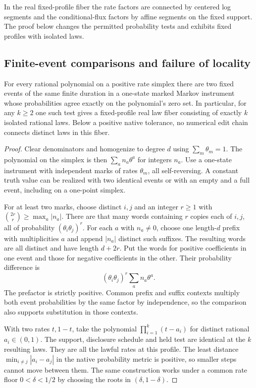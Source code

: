 In the real fixed-profile fiber the rate factors are connected by
centered log segments and the conditional-flux factors by affine
segments on the fixed support. The proof below changes the permitted
probability tests and exhibits fixed profiles with isolated laws.

\subsection{Finite-event comparisons and failure of locality}

\begin{theorem}\label{thm:finite-event}
For every rational polynomial on a positive rate simplex there are
two fixed events of the same finite duration in a one-state marked
Markov instrument whose probabilities agree exactly on the
polynomial's zero set. In particular, for any \(k\geq2\) one such
test gives a fixed-profile real law fiber consisting of exactly
\(k\) isolated rational laws. Below a positive native tolerance,
no numerical edit chain connects distinct laws in this fiber.
\end{theorem}

\begin{proof}
Clear denominators and homogenize to degree \(d\) using
\(\sum_m\theta_m=1\). The polynomial on the simplex is then
\(\sum_a n_a\theta^a\) for integers \(n_a\). Use a one-state
instrument with independent marks of rates \(\theta_m\), all
self-reversing. A constant truth value can be realized with two
identical events or with an empty and a full event, including on
a one-point simplex.

For at least two marks, choose distinct \(i,j\) and an integer
\(r\geq1\) with \(\binom{2r}{r}\geq\max_a |n_a|\).
There are that many words containing \(r\) copies each of \(i,j\),
all of probability \((\theta_i\theta_j)^r\). For each \(a\) with
\(n_a\ne0\), choose one length-\(d\) prefix with multiplicities \(a\)
and append \(|n_a|\) distinct such suffixes. The resulting words
are all distinct and have length \(d+2r\). Put the words for
positive coefficients in one event and those for negative
coefficients in the other. Their probability difference is
\[
 (\theta_i\theta_j)^r\sum_a n_a\theta^a.
\]
The prefactor is strictly positive. Common prefix and suffix
contexts multiply both event probabilities by the same factor
by independence, so the comparison also supports substitution
in those contexts.

With two rates \(t,1-t\), take the polynomial
\(\prod_{i=1}^k(t-a_i)\) for distinct rational
\(a_i\in(0,1)\). The support, disclosure schedule and held test
are identical at the \(k\) resulting laws. They are all the lawful
rates at this profile. The least distance \(\min_{i\ne j}|a_i-a_j|\)
in the native probability metric is positive, so smaller steps
cannot move between them. The same construction works under a
common rate floor \(0<\delta<1/2\) by choosing the roots in
\((\delta,1-\delta)\).
\end{proof}
